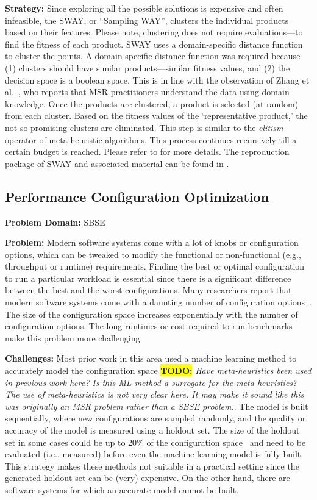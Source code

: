 \documentclass[sigconf,anonymous,review]{acmart}
\newcommand\TODO[1]{\textcolor{ScarletRed}{\textbf{\colorbox{yellow}{\small TODO:}} \emph{#1}}\xspace}
\begin{document}
\noindent\textbf{Strategy:} Since exploring all the possible solutions is expensive and often infeasible, the SWAY, or ``Sampling WAY'', clusters the individual products based on their features. Please note, clustering does not require evaluations---to find the fitness of each product. SWAY uses a domain-specific distance function to cluster the points. A domain-specific distance function was required because (1) clusters should have similar products---similar fitness values, and (2) the decision space is a boolean space. This is in line with the observation of Zhang et al.~\cite{zhang2013software}, who reports that MSR practitioners understand the data using domain knowledge. Once the products are clustered, a product is selected (at random) from each cluster. Based on the fitness values of the `representative product,' the not so promising clusters are eliminated. This step is similar to the \textit{elitism} operator of meta-heuristic algorithms. This process continues recursively till a certain budget is reached. Please refer to \cite{nair2016accidental, chen2017beyond, chen2017sampling} for more details. The reproduction package of SWAY and associated material can be found in .


\subsection{Performance Configuration Optimization}
\noindent\textbf{Problem Domain: } SBSE

\noindent\textbf{Problem: } Modern software systems come with a lot of knobs or configuration options, which can be tweaked to modify the functional or non-functional (e.g., throughput or runtime) requirements. Finding the best or optimal configuration to run a particular workload is essential since there is a significant difference between the best and the worst configurations. Many researchers report that modern software systems come with a daunting number of configuration options~\cite{xu2015hey}. The size of the configuration space increases exponentially with the number of configuration options. The long runtimes or cost required to run benchmarks make this problem more challenging.

\noindent\textbf{Challenges: } Most prior work in this area used a machine learning method to accurately model the
configuration space \TODO{Have meta-heuristics been used in previous work here? Is this ML method a surrogate for the meta-heuristics? The use of meta-heuristics is not very clear here. It may make it sound like this was originally an MSR problem rather than a SBSE problem.}. The model is built sequentially, where new configurations are sampled randomly, and the quality
or accuracy of the model is measured using a holdout set. The size of the holdout set in some cases could be up to 20\% of the configuration space~\cite{nair2017using} and need to be evaluated (i.e., measured) before even the machine learning model is fully built. This strategy makes these methods not suitable in a practical setting since the generated holdout set can be (very) expensive. On the other hand, there are software systems for which an accurate model cannot be built. 
\end{document}
